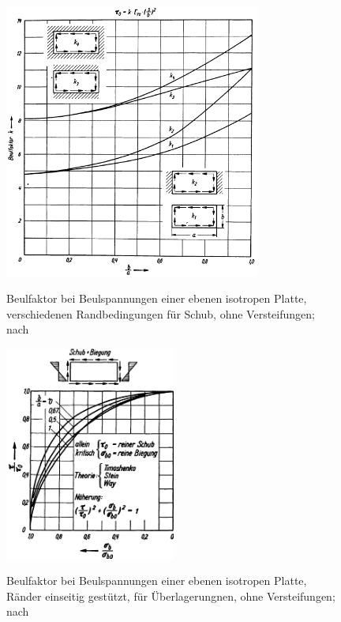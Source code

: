 \begin{figure}[h]
	\centering
	\includegraphics[width=0.75\textwidth]{Bilder/Hertel Schub.png}
	\label{fig: Hertel_Schub}
	\caption{Beulfaktor bei Beulspannungen einer ebenen isotropen Platte, verschiedenen Randbedingungen für Schub, ohne Versteifungen; nach \cite{item1}}
\end{figure}
\begin{figure}[h]
	\centering
	\includegraphics[width=0.5\textwidth]{Bilder/Hertel Sicherheit.png}
	\label{fig: Hertel_Sicherheit}
	\caption{Beulfaktor bei Beulspannungen einer ebenen isotropen Platte, Ränder einseitig gestützt, für Überlagerungnen, ohne Versteifungen; nach \cite{item1}}
\end{figure}
